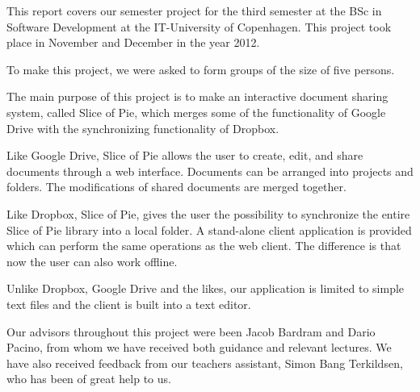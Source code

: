 This report covers our semester project for the third semester at the BSc in Software Development at the IT-University of Copenhagen. This project took place in November and December in the year 2012. 

To make this project, we were asked to form groups of the size of five persons. 

The main purpose of this project is to make an interactive document sharing system, called Slice of Pie, which merges some of the functionality of Google Drive with the synchronizing functionality of Dropbox.
 
Like Google Drive, Slice of Pie allows the user to create, edit, and share documents through a web interface. Documents can be arranged into projects and folders. The modifications of shared documents are merged together.

Like Dropbox, Slice of Pie, gives the user the possibility to synchronize the entire Slice of Pie library into a local folder. A stand-alone client application is provided which can perform the same operations as the web client. The difference is that now the user can also work offline.

Unlike Dropbox, Google Drive and the likes, our application is limited to simple text files and the client is built into a text editor.

Our advisors throughout this project were been Jacob Bardram and Dario Pacino, from whom we have received both guidance and relevant lectures. We have also received feedback from our teachers assistant, Simon Bang Terkildsen, who has been of great help to us.
